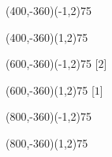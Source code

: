 \documentclass[12pt]{article}
\begin{document}
\begin{figure}[htb]
\begin{egame}
\putbranch(400,-360)(-1,2){75}

\renewcommand{\egarrowstyle}{}

\putbranch(400,-360)(1,2){75}






\renewcommand{\egarrowstyle}{}

\putbranch(600,-360)(-1,2){75}
[$2$]

\renewcommand{\egarrowstyle}{}

\putbranch(600,-360)(1,2){75}
[$1$]




\renewcommand{\egarrowstyle}{}

\putbranch(800,-360)(-1,2){75}

\renewcommand{\egarrowstyle}{}

\putbranch(800,-360)(1,2){75}






\end{egame}
\end{figure}
\end{document}
